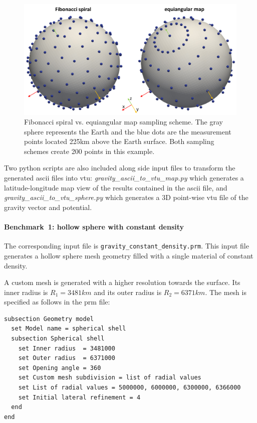 \begin{figure}[h!]
\centering
\includegraphics[scale=0.75]{../../benchmarks/gravity_prem/doc/spiral_VS_map_sampling.jpg}
\caption{Fibonacci spiral vs. equiangular map sampling scheme. The gray sphere represents the Earth and the blue dots are the measurement points located 225\si{km} above the Earth surface. Both sampling schemes create 200 points in this example.}
\label{fig:gravityspiral}
\end{figure}

Two python scripts are also included along side input files to transform the generated ascii files into vtu:
{\sl gravity\_ascii\_to\_vtu\_map.py} which generates a latitude-longitude map view of the results contained in the ascii file, and {\sl gravity\_ascii\_to\_vtu\_sphere.py}
which generates a 3D point-wise vtu file of the gravity vector and potential.


\paragraph{Benchmark~1: hollow sphere with constant density}
\hfill \break
The corresponding input file is \texttt{gravity\_constant\_density.prm}.
This input file generates a hollow sphere mesh geometry filled with a single material of constant density.  

A custom mesh is generated with a higher resolution towards the surface. Its inner radius is $R_1=3481 \si{km}$ and its outer radius is $R_2=6371 \si{km}$. The mesh is specified as follows in the prm file:

\begin{lstlisting}
subsection Geometry model
  set Model name = spherical shell
  subsection Spherical shell
    set Inner radius  = 3481000
    set Outer radius  = 6371000
    set Opening angle = 360
    set Custom mesh subdivision = list of radial values
    set List of radial values = 5000000, 6000000, 6300000, 6366000
    set Initial lateral refinement = 4
  end
end
\end{lstlisting}

